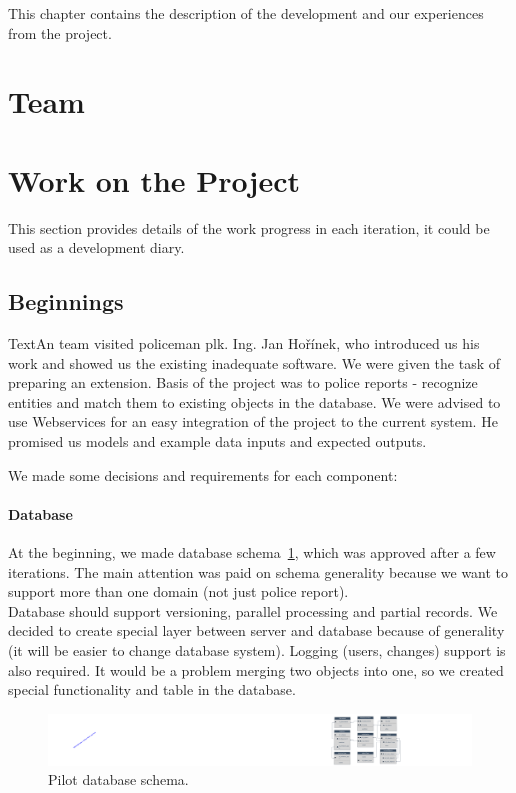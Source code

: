 This chapter contains the description of the development and our experiences from
the project.

\section{Team}

\section{Work on the Project}

This section provides details of the work progress in each iteration, it could be
used as a development diary.

\subsection{Beginnings}
TextAn team visited policeman plk. Ing. Jan Hořínek, who introduced us his work and showed
us the existing inadequate software. We were given the task of preparing an extension.
Basis of the project was to police reports - recognize entities and match them
to existing objects in the database. We were advised to use Webservices for
an easy integration of the project to the current system. He promised us models
and example data inputs and expected outputs. 

We made some decisions and requirements for each component:

\paragraph{Database}
At the beginning, we made database schema~\ref{fig:dbpilot}, which was approved  after a few
iterations. The main attention was paid on schema generality because we want to
support more than one domain (not just police report).\\
Database should support versioning, parallel processing and partial records. We
decided to create special layer between server and database because of
generality (it will be easier to change database system). Logging (users,
changes) support is also required. It would be a problem merging two objects into 
one, so we created special functionality and table in the
database.
\begin{figure}[!htb]
        \centering
        \includegraphics[width=\textwidth]{Images/db-pilot}
        \caption{Pilot database schema.}
        \label{fig:dbpilot}
\end{figure}

